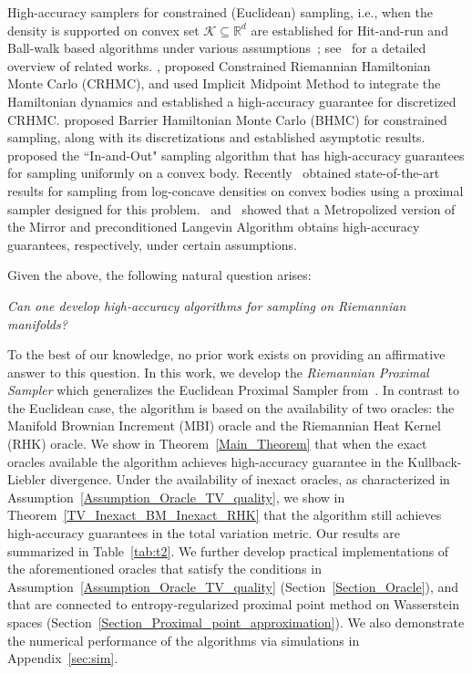 High-accuracy samplers for constrained (Euclidean) sampling, i.e., when the density is supported on convex set $\mathcal{K} \subseteq \mathbb{R}^{d}$ are established for Hit-and-run and Ball-walk based algorithms under various assumptions~\citep{lovasz1999hit,kannan2006blocking,kannan1997random}; see~\citet[Section 1.3]{kook2025renyi} for a detailed overview of related works. \cite{kook2022sampling}, proposed Constrained Riemannian Hamiltonian Monte Carlo (CRHMC), and used Implicit Midpoint Method to integrate the Hamiltonian dynamics and established a high-accuracy guarantee for discretized CRHMC. \cite{noble2023unbiased} proposed Barrier Hamiltonian Monte Carlo (BHMC) for constrained sampling, along with its discretizations and established asymptotic results. \cite{kook2024and} proposed the ``In-and-Out" sampling algorithm that has high-accuracy guarantees for sampling uniformly on a convex body. Recently~\cite{kook2024sampling} obtained state-of-the-art results for sampling from log-concave densities on convex bodies using a proximal sampler designed for this problem.~\cite{srinivasan2024fast} and~\cite{srinivasan2024high} showed that a Metropolized version of the Mirror and preconditioned Langevin Algorithm obtains high-accuracy guarantees, respectively, under certain assumptions.

Given the above, the following natural question arises: 
\begin{center}
   \emph{Can one develop high-accuracy algorithms for sampling on Riemannian manifolds?} 
\end{center}
To the best of our knowledge, no prior work exists on providing an affirmative answer to this question. In this work, we develop the \emph{Riemannian Proximal Sampler} which generalizes the Euclidean Proximal Sampler from~\cite{lee2021structured}. In contrast to the Euclidean case, the algorithm is based on the availability of two oracles: the Manifold Brownian Increment (MBI) oracle and the Riemannian Heat Kernel (RHK) oracle. We show in Theorem~\ref{Main_Theorem} that when the exact oracles available the algorithm achieves high-accuracy guarantee in the Kullback-Liebler divergence. Under the availability of inexact oracles, as characterized in Assumption~\ref{Assumption_Oracle_TV_quality}, we show in Theorem~\ref{TV_Inexact_BM_Inexact_RHK} that the algorithm still achieves high-accuracy guarantees in the total variation metric. Our results are summarized in Table~\ref{tab:t2}. We further develop practical implementations of the aforementioned oracles that satisfy the conditions in Assumption~\ref{Assumption_Oracle_TV_quality} (Section~\ref{Section_Oracle}), and that are connected to entropy-regularized proximal point method on Wasserstein spaces (Section~\ref{Section_Proximal_point_approximation}). We also demonstrate the numerical performance of the algorithms via simulations in Appendix~\ref{sec:sim}. 

